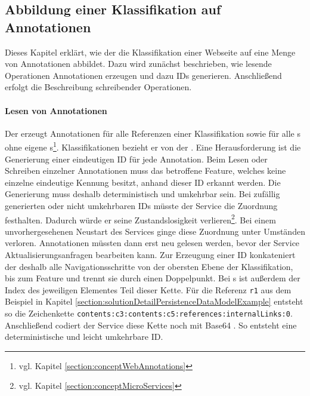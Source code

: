 \subsection{Abbildung einer Klassifikation auf Annotationen}
    \label{section:solutionDetailsAnnotationServiceMapping}
    Dieses Kapitel erklärt, wie der {\annotationService}
    die Klassifikation einer Webseite auf eine Menge von Annotationen abbildet.
    Dazu wird zunächst beschrieben, wie lesende Operationen Annotationen
    erzeugen und dazu IDs generieren.
    Anschließend erfolgt die Beschreibung schreibender Operationen.

    \paragraph{Lesen von Annotationen}
    Der {\annotationService} erzeugt Annotationen für alle Referenzen einer Klassifikation
    sowie für alle {\contentFeature}s ohne eigene
    {\contentFeature}s\footnote{vgl. Kapitel \ref{section:conceptWebAnnotations}}.
    Klassifikationen bezieht er von der {\classificationStorageAPI}.
    Eine Herausforderung ist die Generierung einer eindeutigen ID für jede Annotation.
    Beim Lesen oder Schreiben einzelner Annotationen muss das betroffene
    Feature, welches keine einzelne eindeutige Kennung besitzt, anhand dieser ID erkannt werden.
    Die Generierung muss deshalb deterministisch und umkehrbar sein.
    Bei zufällig generierten oder nicht umkehrbaren IDs müsste der Service
    die Zuordnung festhalten.
    Dadurch würde er seine Zustandslosigkeit
    verlieren\footnote{vgl. Kapitel \ref{section:conceptMicroServices}}.
    Bei einem unvorhergesehenen Neustart des Services ginge diese Zuordnung unter Umständen verloren.
    Annotationen müssten dann erst neu gelesen werden,
    bevor der Service Aktualisierungsanfragen bearbeiten kann.
    Zur Erzeugung einer ID konkateniert der {\annotationService} deshalb
    alle Navigationsschritte von der obersten Ebene der Klassifikation,
    bis zum Feature und trennt sie durch einen Doppelpunkt.
    Bei {\collectionFeature}s ist außerdem der Index des jeweiligen Elementes Teil dieser Kette.
    Für die Referenz \texttt{r1} aus dem Beispiel in Kapitel \ref{section:solutionDetailPersistenceDataModelExample}
    entsteht so die Zeichenkette \texttt{contents:c3:contents:c5:references:internalLinks:0}.
    Anschließend codiert der Service diese Kette noch mit Base64 \cite{rfc:4648}.
    So entsteht eine deterministische und leicht umkehrbare ID.

